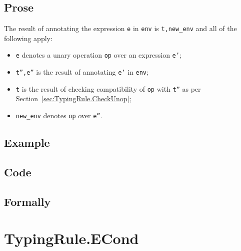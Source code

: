 \documentclass{book}
\begin{document}
  \subsection{Prose}
  The result of annotating the expression \texttt{e} in \texttt{env} is
\texttt{t,new\_env} and all of the following apply:
  \begin{itemize}
  \item \texttt{e} denotes a unary operation \texttt{op} over an expression \texttt{e'};
  \item \texttt{t'',e''} is the result of annotating \texttt{e'} in \texttt{env};
  \item \texttt{t} is the result of checking compatibility of \texttt{op} with \texttt{t''} as per Section~\ref{sec:TypingRule.CheckUnop};
  \item \texttt{new\_env} denotes \texttt{op} over \texttt{e''}.
  \end{itemize}

  \subsection{Example}

  \subsection{Code}

\begin{emptyformal}
    \subsection{Formally}
\end{emptyformal}


\section{TypingRule.ECond \label{sec:TypingRule.ECond}}
\end{document}
